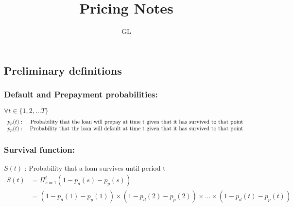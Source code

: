 \documentclass[12pt]{article}
\newenvironment{theorem}[2][Theorem]{\begin{trivlist}
\item[\hskip \labelsep {\bfseries #1}\hskip \labelsep {\bfseries #2.}]}{\end{trivlist}}
\begin{document}
 
 
\title{Pricing Notes}%
\author{GL\\ %
} %
 
\maketitle
 
 


\subsection{ Preliminary definitions} 
\subsubsection{Default and Prepayment probabilities:}
$ \forall t \in \{1,2,...T\}$
\[ %
\begin{array}{rr} %
   p_p(t)  :&  \mbox{
   Probability that the loan will prepay at time t given that it has survived to that point } \\
   p_p(t)  : &  \mbox{
   Probability that the loan will default at time t given that it has survived to that point
   }
\end{array} \noindent%
\] %

 \subsubsection{Survival function:}
$S(t)$ :   Probability that a loan survives until period t 
\begin{align}
S(t) & = \Pi_{s=1}^t (1-p_d(s) - p_p(s)) \\
 & = (1-p_d(1) - p_p(1))\times(1-p_d(2) - p_p(2))\times...\times(1-p_d(t) - p_p(t))
\end{align}
\end{document}

